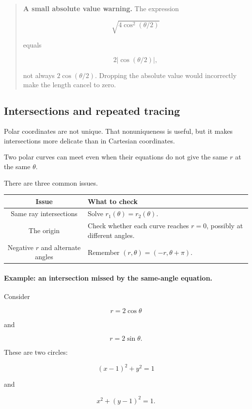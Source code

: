 \begin{quote}
\textbf{A small absolute value warning.}
The expression

\[
\sqrt{4\cos^2(\theta/2)}
\]

equals

\[
2|\cos(\theta/2)|,
\]

not always \(2\cos(\theta/2)\).  Dropping the absolute value would incorrectly make
the length cancel to zero.
\end{quote}

\subsection{Intersections and repeated tracing}
\label{subsec:polar-intersections-repeated-tracing}

Polar coordinates are not unique.  That nonuniqueness is useful, but it makes
intersections more delicate than in Cartesian coordinates.

Two polar curves can meet even when their equations do not give the same \(r\) at the
same \(\theta\).

There are three common issues.

\begin{center}
\begin{tabular}{c|p{}}
\textbf{Issue} & \textbf{What to check} \\ \hline
Same ray intersections & Solve \(r_1(\theta)=r_2(\theta)\). \\[3pt]
The origin & Check whether each curve reaches \(r=0\), possibly at different angles. \\[3pt]
Negative \(r\) and alternate angles & Remember \((r,\theta)=(-r,\theta+\pi)\).
\end{tabular}
\end{center}

\paragraph{Example: an intersection missed by the same-angle equation.}
Consider

\[
r=2\cos\theta
\]

and

\[
r=2\sin\theta.
\]

These are two circles:

\[
(x-1)^2+y^2=1
\]

and

\[
x^2+(y-1)^2=1.
\]

